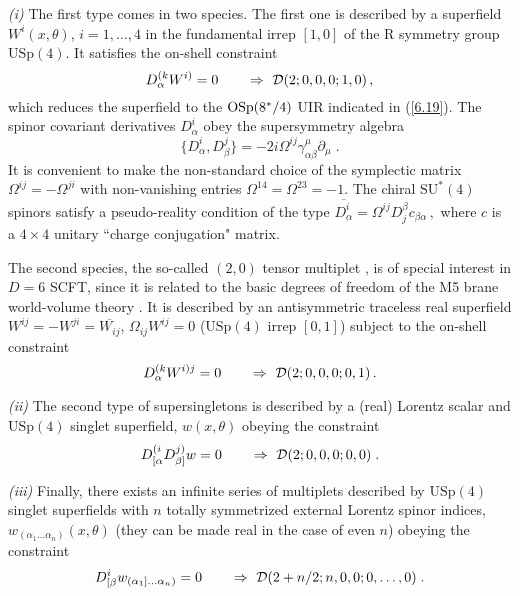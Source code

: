 \documentclass[a4paper,11pt]{article}
\begin{document}
{\sl (i)} The first type comes in two species. The first one is described by a
superfield $W^{i}(x,\theta)$, $i=1,\ldots,4$ in the fundamental irrep $[1,0]$
of the R symmetry group $\mbox{USp}(4)$. It satisfies the on-shell constraint
\begin{equation}\label{6.19}
  D^{(k}_\alpha W^{i)}=0 \qquad \Rightarrow \ {\cal
D}(2;0,0,0;1,0) \, ,
\end{equation}
which reduces the superfield to the $\mbox{\mbox{OSp}}(8^*/4)$ UIR indicated in
(\ref{6.19}). The spinor covariant derivatives $D^i_\alpha$ obey the
supersymmetry algebra
\begin{equation}\label{6.21}
  \{ D^i_\alpha, D^j_\beta\} =
-2i\Omega^{ij}\gamma^\mu_{\alpha\beta}\partial_\mu\;.
\end{equation}
It is convenient to make the non-standard choice of the symplectic matrix
$\Omega^{ij}=-\Omega^{ji}$ with non-vanishing entries $\Omega^{14}=\Omega^{23}=
- 1$. The chiral $\mbox{SU}^*(4)$ spinors satisfy a
pseudo-reality condition of the type $\overline{D_\alpha^i} =
\Omega^{ij}D_j^\beta c_{\beta\alpha} \, ,$ where $c$ is a $4\times 4$ unitary
``charge conjugation" matrix.


The second species, the so-called  $(2,0)$ tensor multiplet
\cite{HST,bsvp}, is of special interest in $D=6$ SCFT, since it is
related to the basic degrees of freedom of the M5 brane
world-volume theory \cite{AGMOO}. It is described by an
antisymmetric traceless real superfield
$W^{ij}=-W^{ji}=\overline{W_{ij}}$, $\Omega_{ij}W^{ij}=0$
($\mbox{USp}(4)$ irrep $[0,1]$) subject to the on-shell constraint
\begin{equation}\label{6.190}
  D^{(k}_\alpha W^{i)j}=0 \qquad \Rightarrow \ {\cal
D}(2;0,0,0;0,1) \,.
\end{equation}


{\sl (ii)} The second type of supersingletons is described by a (real) Lorentz
scalar and $\mbox{USp}(4)$ singlet superfield, $w(x,\theta)$ obeying the
constraint
\begin{equation}\label{6.23}
 D^{(i}_{[\alpha} D^{j)}_{\beta]} w = 0 \qquad \Rightarrow \ {\cal
D}(2;0,0,0;0,0)\;.
\end{equation}

{\sl (iii)} Finally, there exists an infinite series of multiplets described by
$\mbox{USp}(4)$ singlet superfields with $n$ totally symmetrized external
Lorentz spinor indices, $w_{(\alpha_1\ldots\alpha_n)}(x,\theta)$ (they can be
made real in the case of even $n$) obeying the constraint
\begin{equation}\label{6.24}
  D^i_{[\beta}w_{(\alpha_1]\ldots\alpha_n)} = 0 \qquad \Rightarrow \ {\cal
D}(2+n/2;n,0,0;0,\ldots,0)\;.
\end{equation}
\end{document}
